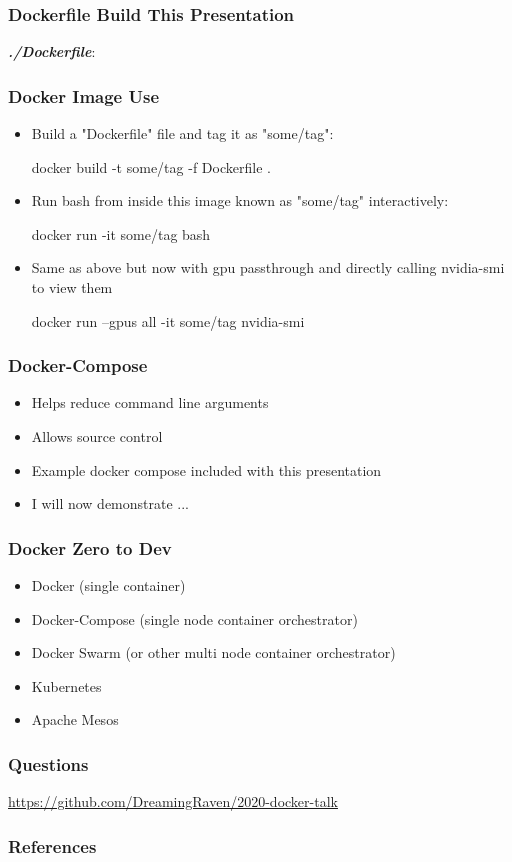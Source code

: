 \documentclass{beamer}
\begin{document}
  \begin{frame}
    \frametitle{Dockerfile Build This Presentation}
    \textbf{\textit{./Dockerfile}}:
  \end{frame}

  \begin{frame}[fragile]%
    \frametitle{Docker Image Use}
    \begin{itemize}
        \item Build a "Dockerfile" file and  tag it as "some/tag":
        \begin{bashcode}
docker build -t some/tag -f Dockerfile .
        \end{bashcode}
        \item Run bash from inside this image known as "some/tag" interactively:
        \begin{bashcode}
docker run -it some/tag bash
        \end{bashcode}
        \item Same as above but now with gpu passthrough and directly calling nvidia-smi to view them
        \begin{bashcode}
docker run --gpus all -it some/tag nvidia-smi
        \end{bashcode}
    \end{itemize}
  \end{frame}

  \begin{frame}
    \frametitle{Docker-Compose}
    \begin{itemize}
        \item Helps reduce command line arguments
        \item Allows source control
        \item Example docker compose included with this presentation
        \item I will now demonstrate ...
    \end{itemize}
  \end{frame}

  \begin{frame}
    \frametitle{Docker Zero to Dev}
    \begin{itemize}
      \item Docker (single container)
      \item Docker-Compose (single node container orchestrator)
      \item Docker Swarm (or other multi node container orchestrator)
    \end{itemize}
    \begin{itemize}
      \item Kubernetes
      \item Apache Mesos
    \end{itemize}
  \end{frame}

  \begin{frame}
      \frametitle{Questions}
      \url{https://github.com/DreamingRaven/2020-docker-talk}
  \end{frame}

  \begin{frame}[allowframebreaks]
    \frametitle{References}
    \printbibliography
  \end{frame}
\end{document}
